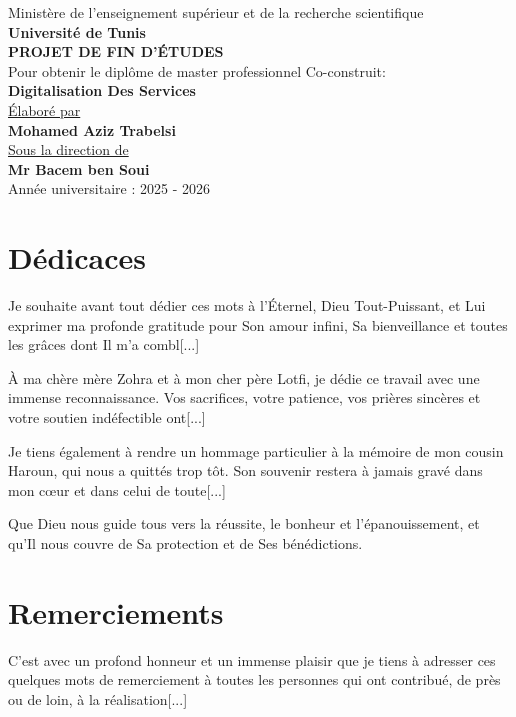 \documentclass[12pt, a4paper]{report}
\begin{document}
\begin{titlepage}
    \centering
    Ministère de l'enseignement supérieur et de la recherche scientifique\\[0.5cm]
    \textbf{Université de Tunis}\\[1cm]
    
    \textbf{\Large PROJET DE FIN D'ÉTUDES}\\[0.5cm]
    Pour obtenir le diplôme de master professionnel Co-construit:\\[0.5cm]
    \textbf{\Large Digitalisation Des Services}\\[1cm]

    \uline{Élaboré par}\\[0.3cm]
    \textbf{Mohamed Aziz Trabelsi}\\[1cm]

    \uline{Sous la direction de}\\[0.3cm]
    \textbf{Mr Bacem ben Soui}\\[1cm]

    Année universitaire : 2025 - 2026\\[1cm]
    \vfill
\end{titlepage}

\chapter*{Dédicaces}
Je souhaite avant tout dédier ces mots à l’Éternel, Dieu Tout-Puissant, et Lui exprimer ma profonde gratitude pour Son amour infini, Sa bienveillance et toutes les grâces dont Il m’a combl[...]

À ma chère mère Zohra et à mon cher père Lotfi, je dédie ce travail avec une immense reconnaissance. Vos sacrifices, votre patience, vos prières sincères et votre soutien indéfectible ont[...]

Je tiens également à rendre un hommage particulier à la mémoire de mon cousin Haroun, qui nous a quittés trop tôt. Son souvenir restera à jamais gravé dans mon cœur et dans celui de toute[...]

Que Dieu nous guide tous vers la réussite, le bonheur et l’épanouissement, et qu’Il nous couvre de Sa protection et de Ses bénédictions.


\chapter*{Remerciements}
C’est avec un profond honneur et un immense plaisir que je tiens à adresser ces quelques mots de remerciement à toutes les personnes qui ont contribué, de près ou de loin, à la réalisation[...]
\end{document}
